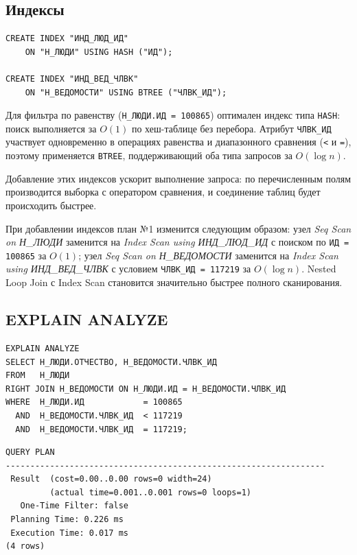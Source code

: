 \documentclass[12pt,a4paper]{article}
\begin{document}
\subsection{Индексы}

\begin{lstlisting}[style=sql]
CREATE INDEX "ИНД_ЛЮД_ИД"
    ON "Н_ЛЮДИ" USING HASH ("ИД");

CREATE INDEX "ИНД_ВЕД_ЧЛВК"
    ON "Н_ВЕДОМОСТИ" USING BTREE ("ЧЛВК_ИД");
\end{lstlisting}

Для фильтра по равенству (\texttt{Н\_ЛЮДИ.ИД = 100865}) оптимален индекс типа
\texttt{HASH}: поиск выполняется за $O(1)$ по хеш-таблице без перебора.
Атрибут \texttt{ЧЛВК\_ИД} участвует одновременно в операциях равенства и
диапазонного сравнения (\texttt{<} и \texttt{=}), поэтому применяется
\texttt{BTREE}, поддерживающий оба типа запросов за $O(\log n)$.

Добавление этих индексов ускорит выполнение запроса: по перечисленным полям
производится выборка с оператором сравнения, и соединение таблиц будет
происходить быстрее.

При добавлении индексов план №1 изменится следующим образом: узел
\textit{Seq Scan on Н\_ЛЮДИ} заменится на \textit{Index Scan using ИНД\_ЛЮД\_ИД}
с поиском по \texttt{ИД = 100865} за $O(1)$; узел
\textit{Seq Scan on Н\_ВЕДОМОСТИ} заменится на \textit{Index Scan using ИНД\_ВЕД\_ЧЛВК}
с условием \texttt{ЧЛВК\_ИД = 117219} за $O(\log n)$.
Nested Loop Join с Index Scan становится значительно быстрее полного сканирования.

\subsection{EXPLAIN ANALYZE}

\begin{lstlisting}[style=planstyle]
EXPLAIN ANALYZE
SELECT Н_ЛЮДИ.ОТЧЕСТВО, Н_ВЕДОМОСТИ.ЧЛВК_ИД
FROM   Н_ЛЮДИ
RIGHT JOIN Н_ВЕДОМОСТИ ON Н_ЛЮДИ.ИД = Н_ВЕДОМОСТИ.ЧЛВК_ИД
WHERE  Н_ЛЮДИ.ИД            = 100865
  AND  Н_ВЕДОМОСТИ.ЧЛВК_ИД  < 117219
  AND  Н_ВЕДОМОСТИ.ЧЛВК_ИД  = 117219;
\end{lstlisting}

\begin{lstlisting}[style=planstyle]
                          QUERY PLAN
-----------------------------------------------------------------
 Result  (cost=0.00..0.00 rows=0 width=24)
         (actual time=0.001..0.001 rows=0 loops=1)
   One-Time Filter: false
 Planning Time: 0.226 ms
 Execution Time: 0.017 ms
(4 rows)
\end{lstlisting}
\end{document}
